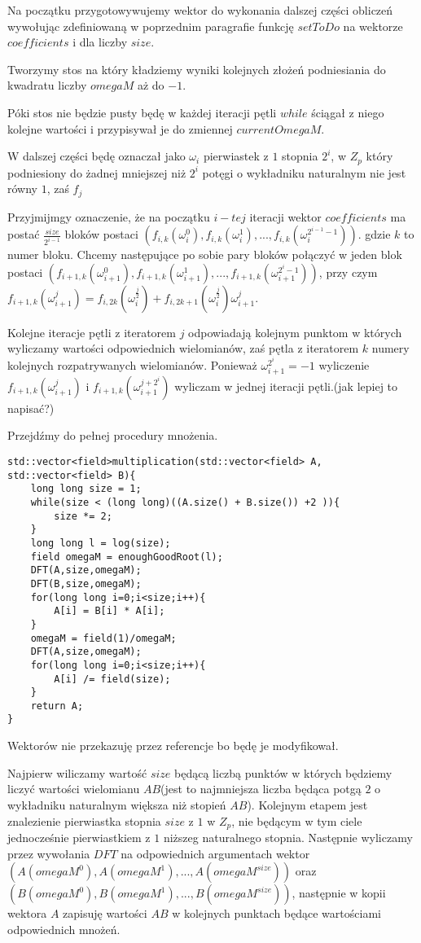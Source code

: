 \documentclass{article}
\begin{document}
Na początku przygotowywujemy wektor do wykonania dalszej części obliczeń wywołując zdefiniowaną w poprzednim paragrafie funkcję $setToDo$ na wektorze $coefficients$ i dla liczby $size$. 

Tworzymy stos na który kładziemy wyniki kolejnych złożeń podniesiania do kwadratu liczby $omegaM$ aż do $-1$.

Póki stos nie będzie pusty będę w każdej iteracji pętli $while$ ściągał z niego kolejne wartości i przypisywał je do zmiennej $currentOmegaM$.

W dalszej części będę oznaczał jako $\omega_i$ pierwiastek z $1$ stopnia $2^i$, w $Z_p$ który podniesiony do żadnej mniejszej niż $2^i$ potęgi o wykładniku
naturalnym nie jest równy $1$, zaś $f_{j}$

Przyjmijmgy oznaczenie, że na początku $i-tej$ iteracji wektor $coefficients$ ma postać $\frac{size}{2^{i-1}}$ bloków postaci
$(f_{i,k}(\omega_i^0),f_{i,k}(\omega_i^1),...,f_{i,k}(\omega^{2^{i-1}-1}_i))$. gdzie $k$ to numer bloku. Chcemy
następujące po sobie pary bloków połączyć w jeden blok postaci $(f_{i+1,k}(\omega_{i+1}^0),f_{i+1,k}(\omega_{i+1}^1),...,
f_{i+1,k}(\omega^{2^{i}-1}_{i+1}))$, przy czym 
$f_{i+1,k}(\omega_{i+1}^j) = f_{i,2k}(\omega_{i}^\frac{j}{2})+f_{i,2k+1}(\omega_{i}^{\frac{j}{2}})\omega_{i+1}^j$. 

Kolejne iteracje pętli z iteratorem $j$ odpowiadają kolejnym punktom w których wyliczamy wartości odpowiednich wielomianów, zaś pętla z iteratorem $k$
numery kolejnych rozpatrywanych wielomianów. Ponieważ $\omega_{i+1}^{2^i}=-1$ wyliczenie $f_{i+1,k}(\omega_{i+1}^{j})$ i $f_{i+1,k}(\omega_{i+1}^{j+2^i})$ 
wyliczam w jednej iteracji pętli.(jak lepiej to napisać?)


Przejdźmy do pełnej procedury mnożenia. 
\begin{lstlisting}
std::vector<field>multiplication(std::vector<field> A, std::vector<field> B){
    long long size = 1;
    while(size < (long long)((A.size() + B.size()) +2 )){
        size *= 2;
    }
    long long l = log(size);
    field omegaM = enoughGoodRoot(l);
    DFT(A,size,omegaM);  
    DFT(B,size,omegaM);
    for(long long i=0;i<size;i++){
        A[i] = B[i] * A[i]; 
    }
    omegaM = field(1)/omegaM;
    DFT(A,size,omegaM);
    for(long long i=0;i<size;i++){
        A[i] /= field(size);
    } 
    return A;
}
\end{lstlisting}
Wektorów nie przekazuję przez referencje bo będę je modyfikował.

Najpierw wiliczamy wartość $size$ będącą liczbą punktów w których będziemy liczyć wartości wielomianu $AB$(jest to najmniejsza liczba będąca potgą 
$2$ o wykładniku naturalnym większa niż stopień $AB$). Kolejnym etapem jest znalezienie pierwiastka stopnia $size$ z $1$ w $Z_p$, nie będącym w tym ciele jednocześnie pierwiastkiem 
z $1$ niższeg naturalnego stopnia. Następnie wyliczamy przez wywołania $DFT$ na odpowiednich argumentach wektor $(A(omegaM^0),A(omegaM^1),...,A(omegaM^{size}))$ oraz
$(B(omegaM^0),B(omegaM^1),...,B(omegaM^{size}))$, następnie w kopii wektora $A$ zapisuję wartości $AB$ w kolejnych punktach będące wartościami odpowiednich 
mnożeń.
\end{document}
